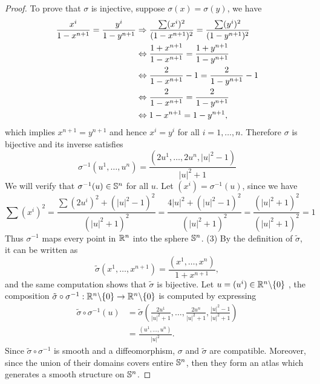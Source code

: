 \begin{proof}
        To prove that  $\sigma$ is injective, suppose $\sigma(x) = \sigma(y)$,  we have
        \begin{align*}
            \frac{x^i}{1 - x^{n + 1}} = \frac{y^i}{1 - y^{n+ 1}} &\Rightarrow \frac{\sum (x^i)^2}{( 1 - x^{n + 1})^2}=\frac{\sum (y^i)^2}{( 1 - y^{n + 1})^2}\\
            &\Leftrightarrow \frac{1 + x^{n + 1}}{1 - x^{n + 1}} = \frac{1 + y^{n + 1}}{1 - y^{n +1}}\\
            &\Leftrightarrow \frac{2}{1 - x^{n + 1}} - 1 =\frac{2}{1 - y^{n + 1}} - 1\\
            &\Leftrightarrow\frac{2}{1 - x^{n + 1}} = \frac{2}{1 - y^{n + 1}}\\
            &\Leftrightarrow 1 - x^{n + 1} = 1 - y^{n + 1},
        \end{align*}
        which implies $x^{n + 1} = y^{n + 1}$ and hence $x^i = y^i$ for all $i = 1,\dots,n$. Therefore $\sigma$ is bijective and its inverse satisfies 
        $$
        \sigma^{-1}\left(u^1, \ldots, u^n\right)=\frac{\left(2 u^1, \ldots, 2 u^n,|u|^2-1\right)}{|u|^2+1}
        $$
        We will verify that $\sigma^{-1}(u) \in \mathbb{S}^{n}$ for all $u$. Let $(x^i) = \sigma^{-1}(u)$, since we have 
        \[
            \sum (x^i)^2 = \frac{\sum(2u^i)^2 + (|u|^2 - 1)^2}{(|u|^2 + 1)^2} = \frac{4|u|^2 + ( |u|^2 - 1)^2}{(|u|^2 + 1)^2} = \frac{(|u|^2 + 1)^2}{(|u|^2 + 1)^2} = 1
        \]
        Thus $\sigma^{-1}$ maps every point in $\mathbb{R}^{n}$ into the sphere $\mathbb{S}^n$.
        (3) By the definition of $\tilde{\sigma}$, it can be written as 
        \[
            \tilde{\sigma}(x^1,\dots,x^{n + 1}) = \frac{(x^1,\dots,x^{n})}{1 + x^{n + 1}},
        \]
        and the same computation shows that $\tilde{\sigma}$ is bijective. Let $u = (u^i) \in \mathbb{R}^n\backslash\{0\}$ , the composition $\tilde{\sigma}\circ \sigma^{-1}: \mathbb{R}^n\backslash\{0\} \to \mathbb{R}^n\backslash\{0\}$ is computed by expressing 
        \begin{align*}
            \tilde{\sigma}\circ \sigma^{-1}(u) &=\tilde{\sigma}\left(\frac{2 u^1}{|u|^2+1}, \ldots, \frac{2 u^n}{|u|^2+1},\frac{|u|^2-1}{|u|^2+1}\right)\\
            &= \frac{(u^1,\dots, u^n)}{|u|^2}.
        \end{align*}
        Since $\tilde{\sigma}\circ \sigma^{-1}$ is smooth and a diffeomorphism, $\sigma$ and $\tilde{\sigma}$ are compatible. Moreover, since the union of their domains covers entire $\mathbb{S}^n$, then they form an atlas which generates a smooth structure on $\mathbb{S}^n$.
        
    \end{proof}
